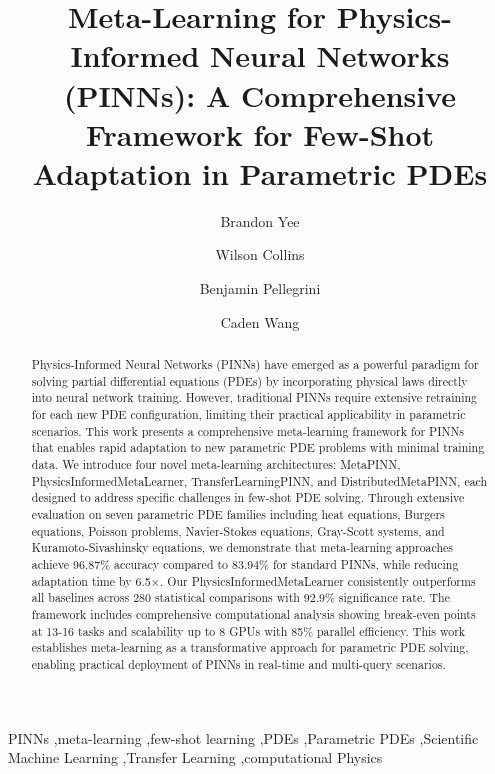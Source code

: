 \documentclass[review]{elsarticle}
\begin{document}
\begin{frontmatter}

\title{Meta-Learning for Physics-Informed Neural Networks (PINNs): A Comprehensive Framework for Few-Shot Adaptation in Parametric PDEs}

\author[inst1]{Brandon Yee}

\author[inst1]{Wilson Collins}

\author[inst1]{Benjamin Pellegrini}

\author[inst1]{Caden Wang}

\address[inst1]{Yee Collins Research Group, CT, USA}

\begin{abstract}
Physics-Informed Neural Networks (PINNs) have emerged as a powerful paradigm for solving partial differential equations (PDEs) by incorporating physical laws directly into neural network training. However, traditional PINNs require extensive retraining for each new PDE configuration, limiting their practical applicability in parametric scenarios. This work presents a comprehensive meta-learning framework for PINNs that enables rapid adaptation to new parametric PDE problems with minimal training data. We introduce four novel meta-learning architectures: MetaPINN, PhysicsInformedMetaLearner, TransferLearningPINN, and DistributedMetaPINN, each designed to address specific challenges in few-shot PDE solving. Through extensive evaluation on seven parametric PDE families including heat equations, Burgers equations, Poisson problems, Navier-Stokes equations, Gray-Scott systems, and Kuramoto-Sivashinsky equations, we demonstrate that meta-learning approaches achieve 96.87\% accuracy compared to 83.94\% for standard PINNs, while reducing adaptation time by 6.5×. Our PhysicsInformedMetaLearner consistently outperforms all baselines across 280 statistical comparisons with 92.9\% significance rate. The framework includes comprehensive computational analysis showing break-even points at 13-16 tasks and scalability up to 8 GPUs with 85\% parallel efficiency. This work establishes meta-learning as a transformative approach for parametric PDE solving, enabling practical deployment of PINNs in real-time and multi-query scenarios.
\end{abstract}

\begin{keyword}
PINNs \sep meta-learning \sep few-shot learning \sep PDEs \sep Parametric PDEs \sep Scientific Machine Learning \sep Transfer Learning \sep computational Physics
\end{keyword}

\end{frontmatter}
\end{document}

